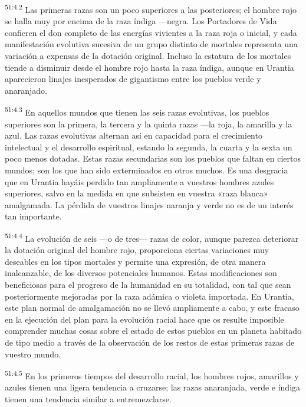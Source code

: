 \par
\textsuperscript{51:4.2} Las primeras razas son un poco superiores a las posteriores; el hombre rojo se halla muy por encima de la raza índiga ---negra. Los Portadores de Vida confieren el don completo de las energías vivientes a la raza roja o inicial, y cada manifestación evolutiva sucesiva de un grupo distinto de mortales representa una variación a expensas de la dotación original. Incluso la estatura de los mortales tiende a disminuir desde el hombre rojo hasta la raza índiga, aunque en Urantia aparecieron linajes inesperados de gigantismo entre los pueblos verde y anaranjado.

\par
\textsuperscript{51:4.3} En aquellos mundos que tienen las seis razas evolutivas, los pueblos superiores son la primera, la tercera y la quinta razas ---la roja, la amarilla y la azul. Las razas evolutivas alternan así en capacidad para el crecimiento intelectual y el desarrollo espiritual, estando la segunda, la cuarta y la sexta un poco menos dotadas. Estas razas secundarias son los pueblos que faltan en ciertos mundos; son los que han sido exterminados en otros muchos. Es una desgracia que en Urantia hayáis perdido tan ampliamente a vuestros hombres azules superiores, salvo en la medida en que subsisten en vuestra «raza blanca» amalgamada. La pérdida de vuestros linajes naranja y verde no es de un interés tan importante.

\par
\textsuperscript{51:4.4} La evolución de seis ---o de tres--- razas de color, aunque parezca deteriorar la dotación original del hombre rojo, proporciona ciertas variaciones muy deseables en los tipos mortales y permite una expresión, de otra manera inalcanzable, de los diversos potenciales humanos. Estas modificaciones son beneficiosas para el progreso de la humanidad en su totalidad, con tal que sean posteriormente mejoradas por la raza adámica o violeta importada. En Urantia, este plan normal de amalgamación no se llevó ampliamente a cabo, y este fracaso en la ejecución del plan para la evolución racial hace que os resulte imposible comprender muchas cosas sobre el estado de estos pueblos en un planeta habitado de tipo medio a través de la observación de los restos de estas primeras razas de vuestro mundo.

\par
\textsuperscript{51:4.5} En los primeros tiempos del desarrollo racial, los hombres rojos, amarillos y azules tienen una ligera tendencia a cruzarse; las razas anaranjada, verde e índiga tienen una tendencia similar a entremezclarse.

